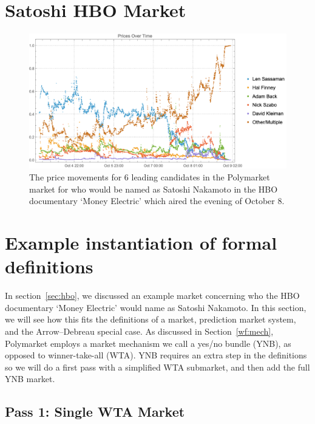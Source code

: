 













\section{Satoshi HBO Market}
\label{app:hbo}

\begin{figure}
  \centering
  \includegraphics[width=\textwidth]{figures/graph.png}
  \caption{The price movements for 6 leading candidates in the Polymarket market for who would be named as Satoshi Nakamoto in the HBO documentary `Money Electric' which aired the evening of October 8.}
  \label{fig:example}
\end{figure}

\section{Example instantiation of formal definitions}
\label{app:example}

In section~\ref{sec:hbo}, we discussed an example market concerning who the HBO documentary `Money Electric' would name as Satoshi Nakamoto. In this section, we will see how this fits the definitions of a market, prediction market system, and the Arrow--Debreau special case. As discussed in Section~\ref{wf:mech}, Polymarket employs a market mechanism we call a yes/no bundle (YNB), as opposed to winner-take-all (WTA). YNB requires an extra step in the definitions so we will do a first pass with a simplified WTA submarket, and then add the full YNB market.

\subsection{Pass 1: Single WTA Market}

